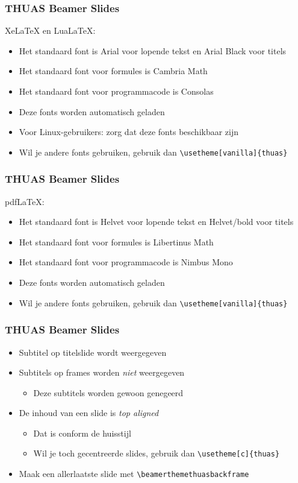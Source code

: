 \documentclass[fleqn,aspectratio=169,dutch,10pt]{beamer}
\begin{document}
\begin{frame}[fragile]
\frametitle{THUAS Beamer Slides}
Xe\LaTeX{} en Lua\LaTeX:
\begin{itemize}
\item Het standaard font is Arial voor lopende tekst en Arial Black voor titels
\item Het standaard font voor formules is Cambria Math
\item Het standaard font voor programmacode is Consolas
\item Deze fonts worden automatisch geladen
\item Voor Linux-gebruikers: zorg dat deze fonts beschikbaar zijn
\item Wil je andere fonts gebruiken, gebruik dan \lstinline|\usetheme[vanilla]{thuas}|
\end{itemize}
\end{frame}


\begin{frame}[fragile]
\frametitle{THUAS Beamer Slides}
pdf\LaTeX{}:
\begin{itemize}
\item Het standaard font is Helvet voor lopende tekst en Helvet/bold voor titels
\item Het standaard font voor formules is Libertinus Math
\item Het standaard font voor programmacode is Nimbus Mono
\item Deze fonts worden automatisch geladen
\item Wil je andere fonts gebruiken, gebruik dan \lstinline|\usetheme[vanilla]{thuas}|
\end{itemize}
\end{frame}


\begin{frame}[fragile]
\frametitle{THUAS Beamer Slides}
\begin{itemize}
\item Subtitel op titelslide wordt weergegeven
\item Subtitels op frames worden \emph{niet} weergegeven
\begin{itemize}
\item Deze subtitels worden gewoon genegeerd
\end{itemize}
\item De inhoud van een slide is \emph{top aligned}
\begin{itemize}
\item Dat is conform de huisstijl
\item Wil je toch gecentreerde slides, gebruik dan \lstinline|\usetheme[c]{thuas}|
\end{itemize}
\item Maak een allerlaatste slide met \lstinline|\beamerthemethuasbackframe|
\end{itemize}
\end{frame}
\end{document}
